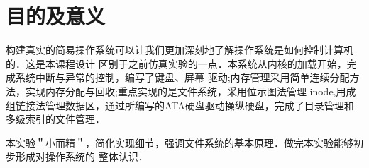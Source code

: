 \chapter{目的及意义} 
构建真实的简易操作系统可以让我们更加深刻地了解操作系统是如何控制计算机的．这是本课程设计
区别于之前仿真实验的一点．本系统从内核的加载开始，完成系统中断与异常的控制，编写了键盘、屏幕
驱动;内存管理采用简单连续分配方法，实现内存分配与回收;重点实现的是文件系统，采用位示图法管理
inode,用成组链接法管理数据区，通过所编写的ATA硬盘驱动操纵硬盘，完成了目录管理和多级索引的文件管理．

本实验＂小而精＂，简化实现细节，强调文件系统的基本原理．做完本实验能够初步形成对操作系统的
整体认识．




